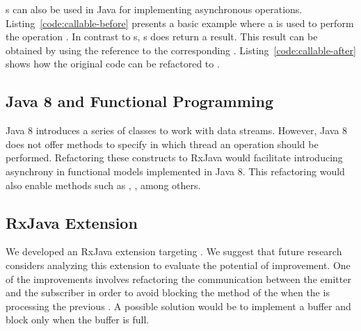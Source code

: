 \documentclass[type=bsc,accentcolor=tud9c]{tudthesis}
\newcommand{\framework}[1]{\textcolor{black!65}{#1}}
\begin{document}


s can also be used in \framework{Java} for implementing asynchronous operations. Listing~\ref{code:callable-before} presents a basic example where a  is used to perform the operation . In contrast to s, s does return a result. This result can be obtained by using the reference to the corresponding . Listing~\ref{code:callable-after} shows how the original code can be refactored to .



\subsection{Java 8 and Functional Programming}
\framework{Java 8} introduces a series of classes to work with data streams. However, \framework{Java 8} does not offer methods to specify in which thread an operation should be performed. Refactoring these constructs to \framework{RxJava} would facilitate introducing asynchrony in functional models implemented in \framework{Java 8}. This refactoring would also enable methods such as , , among others.



\subsection{RxJava Extension}
We developed an \framework{RxJava} extension targeting . We suggest that future research considers analyzing this extension to evaluate the potential of improvement. One of the improvements involves refactoring the communication between the emitter  and the subscriber  in order to avoid blocking the  method of the  when the  is processing the previous . A possible solution would be to implement a buffer and block only when the buffer is full.


\nocite{*}



\def\appendixstart{\chapter{Appendix} \section{SwingWorker API}\label{swingworkerapi}}


\end{document}
